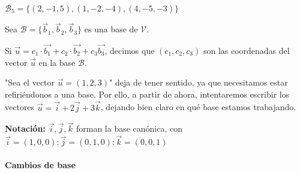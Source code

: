 \begin{problem}
        
        \spart $\mathcal{B}_5 = \{(2,-1,5),(1,-2,-4),(4,-5,-3)\}$
        \subitem {}
    
\end{problem}


\begin{defn}
Sea $\mathcal{B} = \{\vec{b}_1,\vec{b}_2,\vec{b}_3\}$ es una base de $\mathcal{V}$.

Si $\vec{u} = c_1 · \vec{b_1} +  c_2·\vec{b_2} + c_3\vec{b_3}$, decimos que $(c_1,c_2,c_3)$ son las coordenadas del vector $\vec{u}$ en la base $\mathcal{B}$.
\end{defn}

\obs "Sea el vector $\vec{u} = (1,2,3)$" deja de tener sentido, ya que necesitamos estar refiriéndonos a una base. 
%
Por ello, a partir de ahora, intentaremos escribir los vectores $\vec{u} = \vec{i} + 2\vec{j} + 3\vec{k}$, dejando bien claro en qué base estamos trabajando. 

\textbf{Notación:} $\vec{i},\vec{j},\vec{k}$ forman la base canónica, con $\vec{i} = (1,0,0); \vec{j} = (0,1,0); \vec{k} = (0,0,1)$


\paragraph{Cambios de base}

